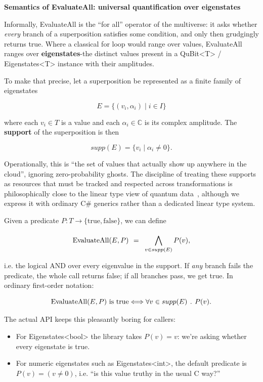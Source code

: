 \documentclass[a4paper,11pt]{article}
\begin{document}
	\textbf{Semantics of EvaluateAll: universal quantification over eigenstates}\label{sec:evaluateall-quantifier}

Informally, EvaluateAll is the ``for all'' operator of the multiverse: it asks whether \emph{every} branch of a superposition satisfies some condition, and only then grudgingly returns true. Where a classical for loop would range over values, EvaluateAll ranges over \textbf{eigenstates}-the distinct values present in a QuBit\textless T\textgreater{} / Eigenstates\textless T\textgreater{} instance with their amplitudes.

To make that precise, let a superposition be represented as a finite family of eigenstates

\[
E = \{(v_{i},\alpha_{i}) \mid i \in I\}
\]

where each \(v_{i} \in T\) is a value and each \(\alpha_{i} \in \mathbb{C}\) is its complex amplitude. The \textbf{support} of the superposition is then

\[supp(E) = \{ v_{i} \mid \alpha_{i} \neq 0\}.
\]

Operationally, this is ``the set of values that actually show up anywhere in the cloud'', ignoring zero-probability ghosts.
The discipline of treating these supports as resources that must be tracked and respected across transformations is philosophically close to the linear type view of quantum data~\parencite{SelingerValiron10}, although we express it with ordinary C\# generics rather than a dedicated linear type system.

Given a predicate \(P:T \rightarrow \{\text{true},\text{false}\}\), we can define

\[\text{EvaluateAll}(E,P)\text{\:\,} = \text{\:\,}\bigwedge_{v \in supp(E)}^{}{}P(v),
\]

i.e. the logical AND over every eigenvalue in the support. If \emph{any} branch fails the predicate, the whole call returns false; if all branches pass, we get true. In ordinary first-order notation:

\[\text{EvaluateAll}(E,P)\text{ is true} \Longleftrightarrow \forall v \in supp(E)\text{\:\,}.\text{\:\,}P(v).
\]

The actual API keeps this pleasantly boring for callers:

\begin{itemize}
\item
  For Eigenstates\textless bool\textgreater{} the library takes \(P(v) = v\): we're asking whether every eigenstate is true.
\item
  For numeric eigenstates such as Eigenstates\textless int\textgreater, the default predicate is \(P(v) = (v \neq 0)\), i.e. ``is this value truthy in the usual C way?'' 
\end{itemize}
\end{document}
